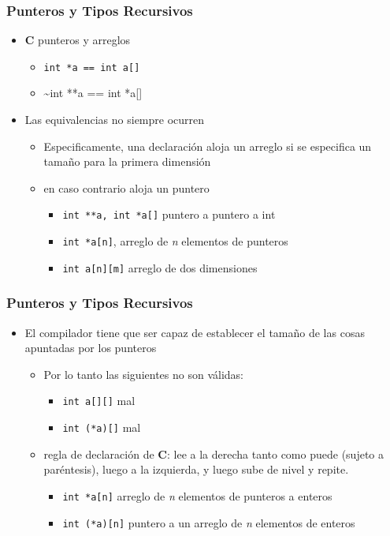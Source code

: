 \documentclass[11pt]{article}
\begin{document}
\subsubsection*{Punteros y Tipos Recursivos}
\label{sec:orgheadline43}
\begin{itemize}
\item \textbf{C} punteros y arreglos
\begin{itemize}
\item \texttt{int *a == int a[]}
\item \textasciitilde{}int **a == int *a[]
\end{itemize}
\item Las equivalencias no siempre ocurren
\begin{itemize}
\item Especificamente, una declaración aloja un arreglo si se especifica
un tamaño para la primera dimensión
\item en caso contrario aloja un puntero
\begin{itemize}
\item \texttt{int **a, int *a[]} puntero a puntero a int
\item \texttt{int *a[n]},  arreglo de \emph{n} elementos de punteros
\item \texttt{int a[n][m]} arreglo de dos dimensiones
\end{itemize}
\end{itemize}
\end{itemize}

\subsubsection*{Punteros y Tipos Recursivos}
\label{sec:orgheadline44}
\begin{itemize}
\item El compilador tiene que ser capaz de establecer el tamaño de las
cosas apuntadas por los punteros
\begin{itemize}
\item Por lo tanto las siguientes no son válidas:
\begin{itemize}
\item \texttt{int a[][]} mal
\item \texttt{int (*a)[]} mal
\end{itemize}
\item regla de declaración de \textbf{C}: lee a la derecha tanto como puede
(sujeto a paréntesis), luego a la izquierda, y luego sube de nivel
y repite.
\begin{itemize}
\item \texttt{int *a[n]} arreglo de \emph{n} elementos de punteros a enteros
\item \texttt{int (*a)[n]} puntero a un arreglo de \emph{n} elementos de enteros
\end{itemize}
\end{itemize}
\end{itemize}
\end{document}
